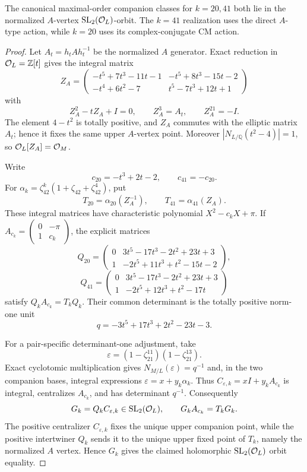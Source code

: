 \begin{proposition}\label{prop:Amaximalpair}
The canonical maximal-order companion classes for $k=20,41$ both lie in the
normalized $A$-vertex $\mathrm{SL}_2(\mathcal O_L)$-orbit.  The $k=41$ realization uses
the direct $A$-type action, while $k=20$ uses its complex-conjugate CM action.
\end{proposition}
\begin{proof}
Let $A_t=h_tAh_t^{-1}$ be the normalized $A$ generator.  Exact reduction in
$\mathcal O_L=\mathbb Z[t]$ gives the integral matrix
\[
Z_A=
\begin{pmatrix}
-t^5+7t^3-11t-1&-t^5+8t^3-15t-2\\
-t^4+6t^2-7&t^5-7t^3+12t+1
\end{pmatrix}
\]
with
\[
 Z_A^2-tZ_A+I=0,\qquad Z_A^3=A_t,\qquad Z_A^{21}=-I.
\]
The element $4-t^2$ is totally positive, and $Z_A$ commutes with the elliptic
matrix $A_t$; hence it fixes the same upper $A$-vertex point.  Moreover
$|N_{L/\mathbb Q}(t^2-4)|=1$, so $\mathcal O_L[Z_A]=\mathcal O_M$.

Write
\[
c_{20}=-t^3+2t-2,\qquad c_{41}=-c_{20}.
\]
For $\alpha_k=\zeta_{42}^k(1+\zeta_{42}+\zeta_{42}^4)$, put
\[
 T_{20}=\alpha_{20}(Z_A^{-1}),\qquad T_{41}=\alpha_{41}(Z_A).
\]
These integral matrices have characteristic polynomial
$X^2-c_kX+\pi$.  If
$A_{c_k}=\left(\begin{smallmatrix}0&-\pi\\1&c_k\end{smallmatrix}\right)$,
the explicit matrices
\[
Q_{20}=\begin{pmatrix}
0&3t^5-17t^3-2t^2+23t+3\\
1&-2t^5+11t^3+t^2-15t-2
\end{pmatrix},
\]
\[
Q_{41}=\begin{pmatrix}
0&3t^5-17t^3-2t^2+23t+3\\
1&-2t^5+12t^3+t^2-17t
\end{pmatrix}
\]
satisfy $Q_kA_{c_k}=T_kQ_k$.  Their common determinant is the totally
positive norm-one unit
\[
 q=-3t^5+17t^3+2t^2-23t-3.
\]

For a pair-specific determinant-one adjustment, take
\[
 \varepsilon=(1-\zeta_{21}^{11})(1-\zeta_{21}^{13}).
\]
Exact cyclotomic multiplication gives $N_{M/L}(\varepsilon)=q^{-1}$ and,
in the two companion bases, integral expressions
$\varepsilon=x+y_k\alpha_k$.  Thus
$C_{\varepsilon,k}=xI+y_kA_{c_k}$ is integral, centralizes $A_{c_k}$, and has
determinant $q^{-1}$.  Consequently
\[
 G_k=Q_kC_{\varepsilon,k}\in\mathrm{SL}_2(\mathcal O_L),\qquad
 G_kA_{c_k}=T_kG_k.
\]
The positive centralizer $C_{\varepsilon,k}$ fixes the unique upper companion
point, while the positive intertwiner $Q_k$ sends it to the unique upper fixed
point of $T_k$, namely the normalized $A$ vertex.  Hence $G_k$ gives the
claimed holomorphic $\mathrm{SL}_2(\mathcal O_L)$ orbit equality.


\end{proof}
